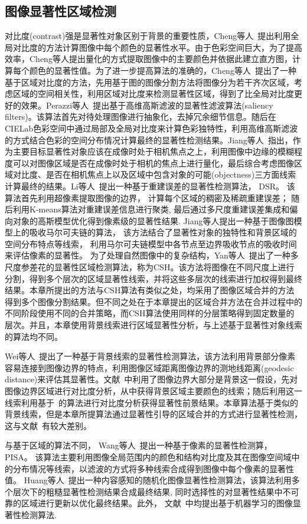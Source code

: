 \subsection{图像显著性区域检测}
\label{sec:SaliencyDetection}
对比度(contrast)强是显著性对象区别于背景的重要性质，Cheng等人~\cite{ChengPAMI}提出利用全局对比度的方法计算图像中每个颜色的显著性水平。由于色彩空间巨大，为了提高效率，Cheng等人提出量化的方式提取图像中的主要颜色并依据此建立直方图，计算每个颜色的显著性值。为了进一步提高算法的准确的，Cheng等人~\cite{ChengPAMI}提出了一种基于区域对比度的方法，先用基于图的图像分割方法将图像分为若干齐次区域，考虑区域的空间相关性，利用区域对比度来检测显著性区域，得到了比全局对比度更好的效果。Perazzi等人~\cite{saliencyFilter}提出基于高维高斯滤波的显著性滤波算法(saliency filters)。该算法首先对待处理图像进行抽象化，去掉冗余细节信息。随后在CIELab色彩空间中通过局部及全局对比度来计算色彩独特性，利用高维高斯滤波的方式结合色彩的空间分布情况计算最终的显著性检测结果。Jiang等人~\cite{ufo}指出，作为主要目标显著性对象应该在成像时处于相机焦点之上，利用图像中边缘的模糊程度可以对图像区域是否在成像时处于相机的焦点上进行量化，最后综合考虑图像区域对比度、是否在相机焦点上以及区域中包含对象的可能(objectness)三方面线索计算最终的结果。Li等人~\cite{DSR}提出一种基于重建误差的显著性检测算法， DSR。 该算法首先利用超像素提取图像的边界， 计算每个区域的稠密及稀疏重建误差； 随后利用K-means算法对重建误差信息进行聚类, 最后通过多尺度重建误差集成和偏向对象的高斯模型优化得到像素级的显著性结果. Jiang等人\cite{MC}提出一种基于图像图模型上的吸收马尔可夫链的算法， 该方法结合了显著性对象的独特性和背景区域的空间分布特点等线索， 利用马尔可夫链模型中各节点至边界吸收节点的吸收时间来评估像素的显著性。 为了处理自然图像中的复杂结构，Yan等人~\cite{ECSSD}提出了一种多尺度参差花的显著性区域检测算法，称为CSH。该方法将图像在不同尺度上进行分割，得到多个层次的区域显著性线索，并将这些多层次的线索进行加权得到最终结果。本章所提出的方法与CSH算法有类似之处，均采用了图像区域合并的方法得到多个图像分割结果。但不同之处在于本章提出的区域合并方法在合并过程中的不同阶段使用不同的合并策略，而CSH算法使用同样的分层策略得到固定数量的层次。并且，本章使用背景线索进行区域显著性分析，与上述基于显著性对象线索的算法均不同。\par
Wei等人~\cite{geodesicDistance}提出了一种基于背景线索的显著性检测算法，该方法利用背景部分像素容易连接到图像边界的特点，利用图像区域距离图像边界的测地线距离(geodesic distance)来评估其显著性。文献~中利用了图像边界大部分是背景这一假设，先对图像边界区域进行对比度分析，从中获得背景区域主要颜色的线索；随后利用这一线索利用基于~的算法进行对比度分析获得显著性前景结果。本章算法基于类似的背景线索，但是本章所提算法通过显著性引导的区域合并的方式进行显著性检测，这与文献~有较大差别。\par
与基于区域的算法不同， Wang等人~\cite{PISA}提出一种基于像素的显著性检测算， PISA。 该算法主要利用图像全局范围内的颜色和结构对比度及其在图像空间域中的分布情况等线索，以滤波的方式将多种线索合成得到图像中每个像素的显著性值。 Huang等人~\cite{Huang2011}提出一种内容感知的随机化图像显著性检测算法，该算法利用多个层次下的粗糙显著性检测结果合成最终结果, 同时选择性的对显著性结果中不可靠的区域进行更新以优化最终结果。此外， 文献~中均提出基于机器学习的图像显著性检测算法.

